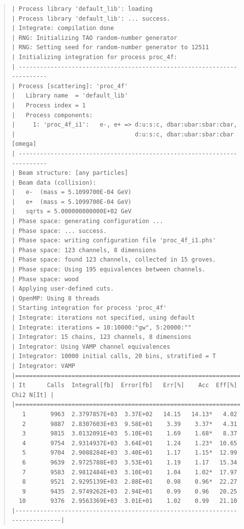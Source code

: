 \documentclass[12pt]{book}
\begin{document}
\begin{quote}
\begin{footnotesize}
\begin{verbatim}
| Process library 'default_lib': loading
| Process library 'default_lib': ... success.
| Integrate: compilation done
| RNG: Initializing TAO random-number generator
| RNG: Setting seed for random-number generator to 12511
| Initializing integration for process proc_4f:
| ------------------------------------------------------------------------
| Process [scattering]: 'proc_4f'
|   Library name  = 'default_lib'
|   Process index = 1
|   Process components:
|     1: 'proc_4f_i1':   e-, e+ => d:u:s:c, dbar:ubar:sbar:cbar,
|                                  d:u:s:c, dbar:ubar:sbar:cbar [omega]
| ------------------------------------------------------------------------
| Beam structure: [any particles]
| Beam data (collision):
|   e-  (mass = 5.1099700E-04 GeV)
|   e+  (mass = 5.1099700E-04 GeV)
|   sqrts = 5.000000000000E+02 GeV
| Phase space: generating configuration ...
| Phase space: ... success.
| Phase space: writing configuration file 'proc_4f_i1.phs'
| Phase space: 123 channels, 8 dimensions
| Phase space: found 123 channels, collected in 15 groves.
| Phase space: Using 195 equivalences between channels.
| Phase space: wood
| Applying user-defined cuts.
| OpenMP: Using 8 threads
| Starting integration for process 'proc_4f'
| Integrate: iterations not specified, using default
| Integrate: iterations = 10:10000:"gw", 5:20000:""
| Integrator: 15 chains, 123 channels, 8 dimensions
| Integrator: Using VAMP channel equivalences
| Integrator: 10000 initial calls, 20 bins, stratified = T
| Integrator: VAMP
|=============================================================================|
| It      Calls  Integral[fb]  Error[fb]   Err[%]    Acc  Eff[%]   Chi2 N[It] |
|=============================================================================|
   1       9963  2.3797857E+03  3.37E+02   14.15   14.13*   4.02
   2       9887  2.8307603E+03  9.58E+01    3.39    3.37*   4.31
   3       9815  3.0132091E+03  5.10E+01    1.69    1.68*   8.37
   4       9754  2.9314937E+03  3.64E+01    1.24    1.23*  10.65
   5       9704  2.9088284E+03  3.40E+01    1.17    1.15*  12.99
   6       9639  2.9725788E+03  3.53E+01    1.19    1.17   15.34
   7       9583  2.9812484E+03  3.10E+01    1.04    1.02*  17.97
   8       9521  2.9295139E+03  2.88E+01    0.98    0.96*  22.27
   9       9435  2.9749262E+03  2.94E+01    0.99    0.96   20.25
  10       9376  2.9563369E+03  3.01E+01    1.02    0.99   21.10
|-----------------------------------------------------------------------------|

\end{verbatim}
\end{footnotesize}
\end{quote}
\end{document}
